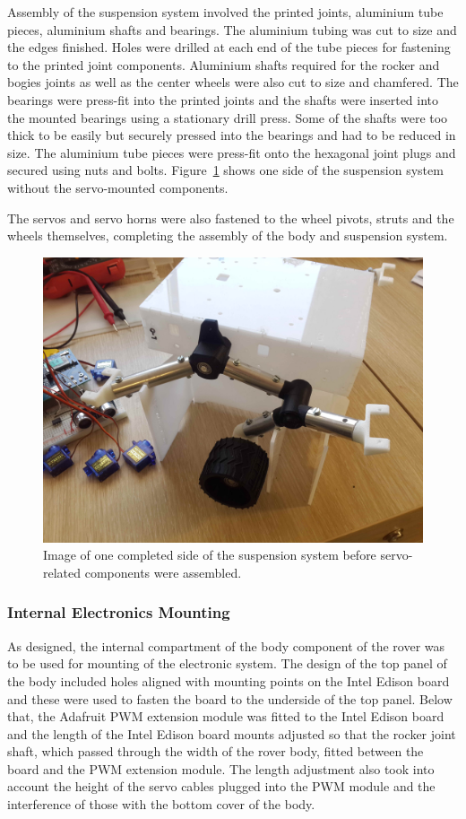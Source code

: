       Assembly of the suspension system involved the printed joints, aluminium tube pieces, aluminium shafts and bearings. The aluminium tubing was cut to size and the edges finished. Holes were drilled at each end of the tube pieces for fastening to the printed joint components. Aluminium shafts required for the rocker and bogies joints as well as the center wheels were also cut to size and chamfered. The bearings were press-fit into the printed joints and the shafts were inserted into the mounted bearings using a stationary drill press. Some of the shafts were too thick to be easily but securely pressed into the bearings and had to be reduced in size. The aluminium tube pieces were press-fit onto the hexagonal joint plugs and secured using nuts and bolts. Figure~\ref{fig:mechBuild-completedSuspensionSide} shows one side of the suspension system without the servo-mounted components.
      
      The servos and servo horns were also fastened to the wheel pivots, struts and the wheels themselves, completing the assembly of the body and suspension system.
      
      \begin{figure}[h!]
        \centering
        \includegraphics[width=0.6\linewidth]{figures/mechBuild-completedSuspensionSide}
        \caption[Image of one completed side of the suspension system before servo-related components were assembled.]{Image of one completed side of the suspension system before servo-related components were assembled.}
        \label{fig:mechBuild-completedSuspensionSide}
      \end{figure}
      
    \subsubsection{Internal Electronics Mounting}
      As designed, the internal compartment of the body component of the rover was to be used for mounting of the electronic system. The design of the top panel of the body included holes aligned with mounting points on the Intel Edison board and these were used to fasten the board to the underside of the top panel. Below that, the Adafruit PWM extension module was fitted to the Intel Edison board and the length of the Intel Edison board mounts adjusted so that the rocker joint shaft, which passed through the width of the rover body, fitted between the board and the PWM extension module. The length adjustment also took into account the height of the servo cables plugged into the PWM module and the interference of those with the bottom cover of the body.
      
